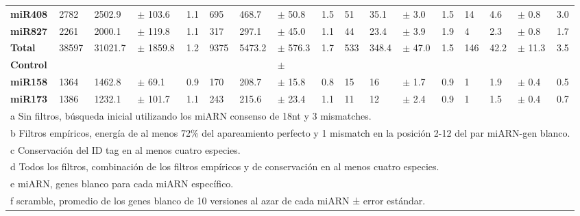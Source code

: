 \begin{landscape}
\begin{table}[]
\begin{tabular}{lllllllllllllllll}
\textbf{miR408}      & 2782           & 2502.9            & $\pm$  103.6     & 1.1            & 695            & 468.7             & $\pm$  50.8      & 1.5            & 51             & 35.1              & $\pm$  3.0       & 1.5            & 14             & 4.6               & $\pm$  0.8       & 3.0            \\
\textbf{miR827}      & 2261           & 2000.1            & $\pm$  119.8     & 1.1            & 317            & 297.1             & $\pm$  45.0      & 1.1            & 44             & 23.4              & $\pm$  3.9       & 1.9            & 4              & 2.3               & $\pm$  0.8       & 1.7            \\
\textbf{Total}       & 38597          & 31021.7           & $\pm$  1859.8    & 1.2            & 9375           & 5473.2            & $\pm$  576.3     & 1.7            & 533            & 348.4             & $\pm$  47.0      & 1.5            & 146            & 42.2              & $\pm$  11.3      & 3.5            \\
\textbf{Control}     &                &                   &                  &                &                &                   & $\pm$            &                &                &                   &                  &                &                &                   &                  &                \\
\textbf{miR158}      & 1364           & 1462.8            & $\pm$  69.1      & 0.9            & 170            & 208.7             & $\pm$  15.8      & 0.8            & 15             & 16                & $\pm$  1.7       & 0.9            & 1              & 1.9               & $\pm$  0.4       & 0.5            \\
\textbf{miR173}      & 1386           & 1232.1            & $\pm$  101.7     & 1.1            & 243            & 215.6             & $\pm$  23.4      & 1.1            & 11             & 12                & $\pm$  2.4       & 0.9            & 1              & 1.5               & $\pm$  0.4       & 0.7           \\
\multicolumn{17}{l}{a Sin filtros, búsqueda inicial utilizando los miARN consenso de 18nt y 3 mismatches.}\\
\multicolumn{17}{l}{b Filtros empíricos, energía de al menos 72\% del apareamiento perfecto y 1 mismatch en la posición 2-12 del par miARN-gen blanco.}\\
\multicolumn{17}{l}{c Conservación del ID tag en al menos cuatro especies.}\\
\multicolumn{17}{l}{d Todos los filtros, combinación de los filtros empíricos y de conservación en al menos cuatro especies.}\\
\multicolumn{17}{l}{e miARN, genes blanco para cada miARN específico.}\\
\multicolumn{17}{l}{f scramble, promedio de los genes blanco de 10 versiones al azar de cada miARN ± error estándar.}\\
\end{tabular}
\end{table}
\end{landscape}


